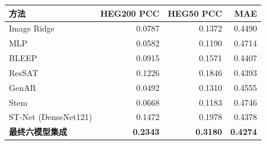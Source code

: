 \begin{tabular}{lrrr}
\toprule
方法 & HEG200 PCC & HEG50 PCC & MAE \\
\midrule
Image Ridge & 0.0787 & 0.1372 & 0.4490 \\
MLP & 0.0582 & 0.1190 & 0.4714 \\
BLEEP & 0.0915 & 0.1571 & 0.4407 \\
ResSAT & 0.1226 & 0.1846 & 0.4393 \\
GenAR & 0.0492 & 0.1310 & 0.4555 \\
Stem & 0.0668 & 0.1183 & 0.4746 \\
ST-Net (DenseNet121) & 0.1472 & 0.1978 & 0.4378 \\
\textbf{最终六模型集成} & \textbf{0.2343} & \textbf{0.3180} & \textbf{0.4274} \\
\bottomrule
\end{tabular}
